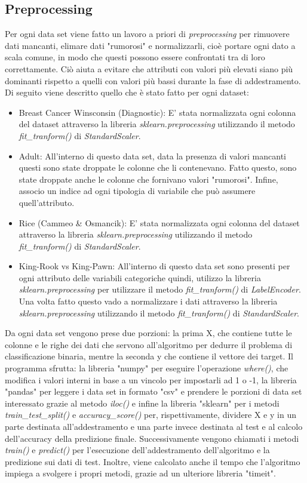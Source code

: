 \documentclass{article}
\begin{document}
	\subsection{Preprocessing}
    Per ogni data set viene fatto un lavoro a priori di \textit{preprocessing} per rimuovere dati mancanti, elimare dati "rumorosi" e normalizzarli, cioè portare ogni dato a scala comune, in modo che questi possono essere confrontati tra di loro correttamente. Ciò aiuta a evitare che attributi con valori più elevati siano più dominanti rispetto a quelli con valori più bassi durante la fase di addestramento.
	Di seguito viene descritto quello che è stato fatto per ogni dataset:
	\begin{itemize}
		\item Breast Cancer Winsconsin (Diagnostic): E' stata normalizzata ogni colonna del dataset attraverso la libreria \textit{sklearn.preprocessing} utilizzando il metodo \textit{fit\_tranform()} di \textit{StandardScaler}.
		\item Adult: All'interno di questo data set, data la presenza di valori mancanti questi sono state droppate le colonne che li contenevano. Fatto questo, sono state droppate anche le colonne che fornivano valori "rumorosi". Infine, associo un indice ad ogni tipologia di variabile che può assumere quell'attributo.
		\item Rice (Cammeo \& Osmancik): E' stata normalizzata ogni colonna del dataset attraverso la libreria \textit{sklearn.preprocessing} utilizzando il metodo \textit{fit\_tranform()} di \textit{StandardScaler}.
		\item King-Rook vs King-Pawn: All'interno di questo data set sono presenti per ogni attributo delle variabili categoriche quindi, utilizzo la libreria \textit{sklearn.preprocessing} per utilizzare il metodo \textit{fit\_tranform()} di \textit{LabelEncoder}. Una volta fatto questo vado a normalizzare i dati attraverso la libreria \textit{sklearn.preprocessing} utilizzando il metodo \textit{fit\_tranform()} di \textit{StandardScaler}.
	\end{itemize} 
	Da ogni data set vengono prese due porzioni: la prima X, che contiene tutte le colonne e le righe dei dati che servono all'algoritmo per dedurre il problema di classificazione binaria, mentre la seconda y che contiene il vettore dei target. Il programma sfrutta: la libreria "numpy" per eseguire l'operazione \textit{where()}, che modifica i valori interni in base a un vincolo per impostarli ad 1 o -1, la libreria "pandas" per leggere i data set in formato "csv" e prendere le porzioni di data set interessato grazie al metodo \textit{iloc()} e infine la libreria "sklearn" per i metodi \textit{train\_test\_split()} e \textit{accuracy\_score()} per, rispettivamente, dividere X e y in un parte destinata all'addestramento e una parte invece destinata al test e al calcolo dell'accuracy della predizione finale.
	Successivamente vengono chiamati i metodi \textit{train()} e \textit{predict()} per l'esecuzione dell'addestramento dell'algoritmo e la predizione sui dati di test. Inoltre, viene calcolato anche il tempo che l'algoritmo impiega a svolgere i propri metodi, grazie ad un ulteriore libreria "timeit".
\end{document}
